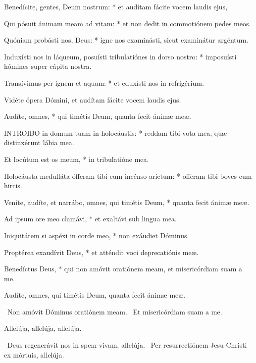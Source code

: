 Benedícite, gentes, Deum nostrum: * et audítam fácite vocem laudis ejus,

Qui pósuit ánimam meam ad vitam: * et non dedit in commotiónem pedes meos.

Quóniam probásti nos, Deus: * igne nos examinásti, sicut examinátur argéntum.

Induxísti nos in láqueum, posuísti tribulatiónes in dorso nostro: * imposuísti hómines super cápita nostra.

Transívimus per ignem et aquam: * et eduxísti nos in refrigérium.

 Vidéte ópera Dómini, et audítam fácite vocem laudis ejus.

 Audíte, omnes, * qui timétis Deum, quanta fecit ánimæ meæ.


\lettrine[lines=2]{I}{NTROIBO} in domum tuam in holocáustis: * reddam tibi vota mea, quæ distinxérunt lábia mea.

Et locútum est os meum, * in tribulatióne mea.

Holocáusta medulláta ófferam tibi cum incénso aríetum: * offeram tibi boves cum hircis.

Veníte, audíte, et narrábo, omnes, qui timétis Deum, * quanta fecit ánimæ meæ.

Ad ipsum ore meo clamávi, * et exaltávi sub lingua mea.

Iniquitátem si aspéxi in corde meo, * non exáudiet Dóminus.

Proptérea exaudívit Deus, * et atténdit voci deprecatiónis meæ.

Benedíctus Deus, * qui non amóvit oratiónem meam, et misericórdiam suam a me.

 Audíte, omnes, qui timétis Deum, quanta fecit ánimæ meæ.



\V\ Non amóvit Dóminus oratiónem meam. \R\ Et misericórdiam suam a me.



 Allelúja, allelúja, allelúja.

\V\ Deus regenerávit nos in spem vivam, allelúja. \R\ Per resurrectiónem Jesu Christi ex mórtuis, allelúja.

